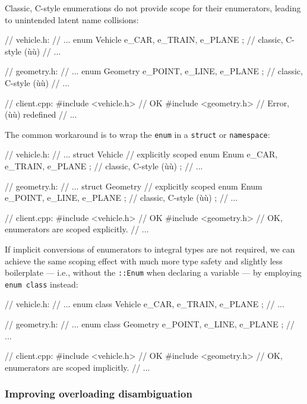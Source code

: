 Classic, C-style enumerations do not provide scope for their
enumerators, leading to unintended latent name collisions:

\begin{emcppslisting}
// vehicle.h:
// ...
enum Vehicle  { e_CAR, e_TRAIN, e_PLANE };  // classic, C-style (ù{}ù)
// ...

// geometry.h:
// ...
enum Geometry { e_POINT, e_LINE, e_PLANE };  // classic, C-style (ù{}ù)
// ...

// client.cpp:
#include <vehicle.h>  // OK
#include <geometry.h> // Error, (ù{}ù) redefined
// ...
\end{emcppslisting}

\noindent The common workaround is to wrap the \lstinline!enum! in a \lstinline!struct!
or \lstinline!namespace!:

\begin{emcppslisting}
// vehicle.h:
// ...
struct Vehicle {                            // explicitly scoped
    enum Enum { e_CAR, e_TRAIN, e_PLANE };  // classic, C-style (ù{}ù)
};
// ...

// geometry.h:
// ...
struct Geometry {                            // explicitly scoped
    enum Enum { e_POINT, e_LINE, e_PLANE };  // classic, C-style (ù{}ù)
};
// ...

// client.cpp:
#include <vehicle.h>    // OK
#include <geometry.h>   // OK, enumerators are scoped explicitly.
// ...
\end{emcppslisting}

\noindent If implicit conversions of enumerators to integral types are not
required, we can achieve the same scoping effect with much more type
safety and slightly less boilerplate --- i.e., without the
\lstinline!::Enum! when declaring a variable --- by employing
\lstinline!enum!~\lstinline!class! instead:

\begin{emcppslisting}
// vehicle.h:
// ...
enum class Vehicle { e_CAR, e_TRAIN, e_PLANE };
// ...

// geometry.h:
// ...
enum class Geometry { e_POINT, e_LINE, e_PLANE };
// ...

// client.cpp:
#include <vehicle.h>  // OK
#include <geometry.h> // OK, enumerators are scoped implicitly.
// ...
\end{emcppslisting}

\subsubsection[Improving overloading disambiguation]{Improving overloading disambiguation}\label{improving-overloading-disambiguation}

